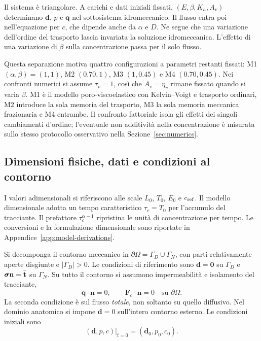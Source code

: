 Il sistema è triangolare. A carichi e dati iniziali fissati, $(E,\beta,K_h,A_v)$ determinano $\mathbf d$, $p$ e $\mathbf q$ nel sottosistema idromeccanico. Il flusso entra poi nell'equazione per $c$, che dipende anche da $\alpha$ e $D$. Ne segue che una variazione dell'ordine del trasporto lascia invariata la soluzione idromeccanica. L'effetto di una variazione di $\beta$ sulla concentrazione passa per il solo flusso.

Questa separazione motiva quattro configurazioni a parametri restanti
fissati: M1 $(\alpha,\beta)=(1,1)$, M2 $(0.70,1)$,
M3 $(1,0.45)$ e M4 $(0.70,0.45)$. Nei confronti
numerici si assume $\tau_v=1$, cos\`i che $A_v=\eta_v$ rimane fissato quando si varia $\beta$. M1 \`e il modello
poro-viscoelastico con Kelvin--Voigt e trasporto ordinari,
M2 introduce la sola memoria del trasporto, M3 la sola memoria
meccanica frazionaria e M4 entrambe. Il confronto fattoriale
isola gli effetti dei singoli cambiamenti d'ordine; l'eventuale
non additivit\`a nella concentrazione \`e misurata sullo stesso
protocollo osservativo nella Sezione~\ref{sec:numerics}.

\subsection{Dimensioni fisiche, dati e condizioni al contorno}
\label{sec:forward-data}

I valori adimensionali si riferiscono alle scale $L_0$, $T_0$, $E_0$ e $c_{\rm ref}$. Il modello dimensionale adotta un tempo caratteristico $\tau_c=T_0$ per l'accumulo del tracciante. Il prefattore $\tau_c^{\alpha-1}$ ripristina le unità di concentrazione per tempo. Le conversioni e la formulazione dimensionale sono riportate in Appendice~\ref{app:model-derivations}.

Si decomponga il contorno meccanico in
$\partial\Omega=\overline{\Gamma_D}\cup\overline{\Gamma_N}$,
con parti relativamente aperte disgiunte e $|\Gamma_D|>0$.
Le condizioni di riferimento sono
$\mathbf d=\mathbf0$ su $\Gamma_D$ e
$\boldsymbol{\sigma}\mathbf n=\bar{\mathbf t}$ su $\Gamma_N$.
Su tutto il contorno si assumono impermeabilit\`a e isolamento
del tracciante,
\begin{equation}
 \mathbf q\cdot\mathbf n=0,\qquad
 \mathbf F_c\cdot\mathbf n=0
 \quad\text{su }\partial\Omega .
 \label{eq:tracerbc}
\end{equation}
La seconda condizione \`e sul flusso \emph{totale}, non soltanto
su quello diffusivo. Nel dominio anatomico si impone
$\mathbf d=0$ sull'intero contorno esterno. Le condizioni iniziali
sono
\begin{equation}
 (\mathbf d,p,c)|_{t=0}=(\mathbf d_0,p_0,c_0).
 \label{eq:initial-data}
\end{equation}


